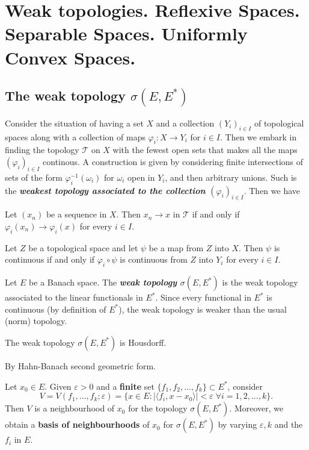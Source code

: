 \documentclass{article}
\theoremstyle{definition}
\numberwithin{equation}{section}
\begin{document}
\section{Weak topologies. Reflexive Spaces. Separable Spaces. Uniformly Convex Spaces.}
	\subsection{The weak topology $\sigma(E,E^*)$}
Consider the situation of having a set $X$ and a collection $(Y_i)_{i\in I}$ of topological spaces along with a collection of maps $\varphi_i:X\to Y_i$ for $i\in I$. Then we embark in finding the topology $\mathcal{T}$ on $X$ with the fewest open sets that makes all the maps $(\varphi_i)_{i\in I}$ continous. A construction is given by considering finite intersections of sets of the form $\varphi_i^{-1}(\omega_i)$ for $\omega_i$ open in $Y_i$, and then arbitrary unions. Such is the \textbf{\textit{weakest topology associated to the collection $(\varphi_i)_{i\in I}$}}. Then we have
\begin{prop}
	Let $(x_n)$ be a sequence in $X$. Then $x_n\to x$ in $\mathcal{T}$ if and only if $\varphi_i(x_n)\to \varphi_i(x)$ for every $i\in I$.
\end{prop}
\begin{prop}\label{prop:universal-property-weak-topology}
	Let $Z$ be a topological space and let $\psi$ be a map from $Z$ into $X$. Then $\psi$ is continuous if and only if $\varphi_i\circ\psi$ is continuous from $Z$ into $Y_i$ for every $i\in I$.
\end{prop}
Let $E$ be a Banach space. The \textbf{\textit{weak topology $\sigma (E,E^*)$}} is the weak topology associated to the linear functionals in $E^*$. Since every functional in $E^*$ is continuous (by definition of $E^*$), the weak topology is weaker than the usual (norm) topology.
\begin{prop}
	The weak topology $\sigma(E,E^*)$ is Housdorff.
\end{prop}
\begin{prop}
	By Hahn-Banach second geometric form.
\end{prop}
\begin{prop}\label{prop:neighbourhoods-weak-topology}
	Let $x_0\in E$. Given $\varepsilon>0$ and a \textbf{finite} set $\{f_1,f_2,\ldots,f_k\}\subset E^*$, consider
	\[V=V(f_1,\ldots,f_k;\varepsilon)=\{x\in E:|\langle f_i,x-x_0\rangle|<\varepsilon\;\forall i=1,2,\ldots,k\}.\]
	Then $V$ is a neighbourhood of $x_0$ for the topology $\sigma(E,E^*)$. Moreover, we obtain a \textbf{basis of neighbourhoods} of $x_0$ for $\sigma(E,E^*)$ by varying $\varepsilon,k$ and the $f_i$ in $E$.
\end{prop}
\end{document}

